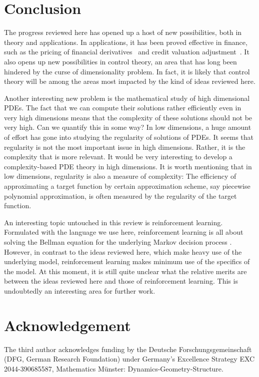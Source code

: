 \documentclass[12pt]{article}
\theoremstyle{definition}
\begin{document}
\section{Conclusion}
The progress reviewed here  has opened up a host of  new possibilities, both in theory and applications.
In applications, it has been proved effective in finance, such as the pricing of financial derivatives~\cite{wang2018deep,BeckerCheridito2019,BeckerCheriditoJentzen2019,becker2020pricing} and credit valuation adjustment~\cite{gnoatto2020deep}. 
It also opens up new possibilities in control theory, an area that has long been hindered by the curse of dimensionality problem.
In fact, it is likely that control theory will be among the areas most impacted by the kind of ideas reviewed here.

Another interesting new problem is the mathematical study of high dimensional PDEs.  The fact that we can compute their solutions rather efficiently even in very high dimensions means that the complexity of these solutions should not be very high.  Can we quantify this in some way?
In low dimensions, a  huge amount of effort has gone into studying the regularity of solutions of PDEs.  It seems that regularity is not the most important issue in high dimensions.  Rather, it is the complexity that is more relevant. It would be very interesting to develop a complexity-based PDE theory in high dimensions.  It is worth mentioning that in low dimensions, regularity is also
a measure of complexity:  The efficiency of approximating a target function by certain approximation scheme, say piecewise polynomial approximation, is often measured by the regularity of the target function.

An interesting topic untouched in this review is reinforcement learning.  Formulated with the language we use here, reinforcement learning is  all about solving the Bellman equation for the underlying Markov decision process \cite{sutton2018reinforcement}.
However, in contrast to the ideas reviewed here, which make heavy use of the underlying model, reinforcement learning makes minimum use of the specifics of the model. At this moment, it is still quite unclear what the relative merits are between the ideas reviewed here and those of reinforcement learning.  This is undoubtedly an interesting area for further work.


\section*{Acknowledgement}
The third author acknowledges funding by the Deutsche Forschungsgemeinschaft (DFG, German Research Foundation) under Germany’s Excellence Strategy EXC 2044-390685587, Mathematics M\"{u}nster: Dynamics-Geometry-Structure.



\end{document}
